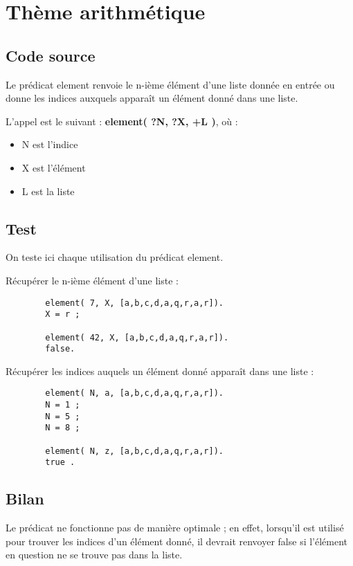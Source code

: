
\section{Thème arithmétique}

    \subsection{Code source}

        

	Le prédicat element renvoie le n-ième élément d'une liste donnée en
	entrée ou donne les indices auxquels apparaît un élément donné dans
	une liste.

	L'appel est le suivant : \textbf{element( ?N, ?X, +L )}, où :
	\begin {itemize}
	    \item N est l'indice
	    \item X est l'élément
	    \item L est la liste
	\end {itemize}

    \subsection{Test}
	On teste ici chaque utilisation du prédicat element.

	Récupérer le n-ième élément d'une liste :

	\begin {lstlisting}
	    element( 7, X, [a,b,c,d,a,q,r,a,r]).
	    X = r ;
	    
	    element( 42, X, [a,b,c,d,a,q,r,a,r]).
	    false.
	\end {lstlisting}

	Récupérer les indices auquels un élément donné apparaît dans une liste
	:

	\begin {lstlisting}
	    element( N, a, [a,b,c,d,a,q,r,a,r]).
	    N = 1 ;
	    N = 5 ;
	    N = 8 ;
	    
	    element( N, z, [a,b,c,d,a,q,r,a,r]).
	    true .
	\end {lstlisting}

    \subsection{Bilan}


    Le prédicat ne fonctionne pas de manière optimale ; en effet, lorsqu'il
    est utilisé pour trouver les indices d'un élément donné, il devrait
    renvoyer false si l'élément en question ne se trouve pas dans la liste.
